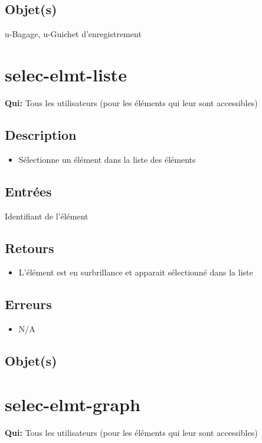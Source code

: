 	\subsection{Objet(s)}
		u-Bagage, u-Guichet d'enregistrement

\section{selec-elmt-liste}
	\textbf{Qui:} Tous les utilisateurs (pour les éléments qui leur sont accessibles)

	\subsection{Description}
	\begin{itemize}
		\item Sélectionne un élément dans la liste des éléments
	\end{itemize}

	\subsection{Entrées}
		Identifiant de l'élément

	\subsection{Retours}
	\begin{itemize}
		\item L'élément est en surbrillance et apparait sélectionné dans la liste
	\end{itemize}

	\subsection{Erreurs}
	\begin{itemize}
		\item N/A
	\end{itemize}

	\subsection{Objet(s)}
		\allobjs

\section{selec-elmt-graph}
	\textbf{Qui:} Tous les utilisateurs (pour les éléments qui leur sont accessibles)

